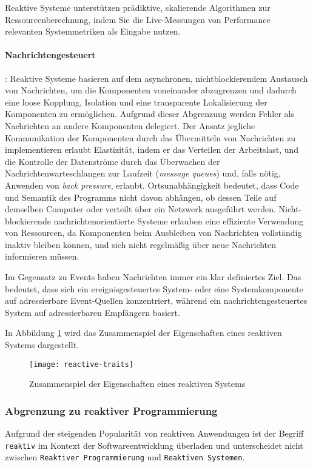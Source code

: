 Reaktive Systeme unterstützen prädiktive, skalierende Algorithmen zur Ressourcenberechnung,
indem Sie die Live-Messungen von Performance relevanten Systemmetriken als Eingabe nutzen.

\paragraph{Nachrichtengesteuert}: Reaktive Systeme basieren auf dem asynchronen, nichtblockierendem Austausch von Nachrichten, um die Komponenten voneinander
abzugrenzen und dadurch eine loose Kopplung, Isolation und eine transparente Lokalisierung der Komponenten zu ermöglichen.
Aufgrund dieser Abgrenzung werden Fehler als Nachrichten an andere Komponenten delegiert.
Der Ansatz jegliche Kommunikation der Komponenten durch das Übermitteln von Nachrichten zu implementieren erlaubt Elastizität,
indem er das Verteilen der Arbeitslast, und die Kontrolle der Datenströme durch das Überwachen der Nachrichtenwarteschlangen zur Laufzeit
(\textit{message queues}) und, falls nötig, Anwenden von \textit{back pressure}, erlaubt.
Ortsunabhängigkeit bedeutet, dass Code und Semantik des Programms nicht davon abhängen, ob dessen Teile auf demselben Computer
oder verteilt über ein Netzwerk ausgeführt werden.
Nicht-blockierende nachrichtenorientierte Systeme erlauben eine effiziente Verwendung von Ressourcen, da Komponenten beim Ausbleiben von
Nachrichten vollständig inaktiv bleiben können, und sich nicht regelmäßig über neue Nachrichten informieren müssen.\parencite{ReactiveSystems}

Im Gegensatz zu Events haben Nachrichten immer ein klar definiertes Ziel.
Das bedeutet, dass sich ein ereignisgesteuertes System- oder eine Systemkomponente auf adressierbare Event-Quellen konzentriert,
während ein nachrichtengesteuertes System auf adressierbaren Empfängern basiert.

In Abbildung \ref{fig:reactive-traits} wird das Zusammenspiel der Eigenschaften eines reaktiven Systems dargestellt.

\begin{figure}[ht!]
    \centering
    \texttt{[image: reactive-traits]}
    \caption{Zusammenspiel der Eigenschaften eines reaktiven Systems \parencite{ReactiveSystems}}
    \label{fig:reactive-traits}
\end{figure}

\subsubsection{Abgrenzung zu reaktiver Programmierung}
\label{subsubsection:abgrenzung_reaktive_programmierung}
Aufgrund der steigenden Popularität von reaktiven Anwendungen ist der Begriff \verb|reaktiv| im Kontext der Softwareentwicklung
überladen und unterscheidet nicht zwischen \linebreak\verb|Reaktiver Programmierung| und \verb|Reaktiven Systemen|.

